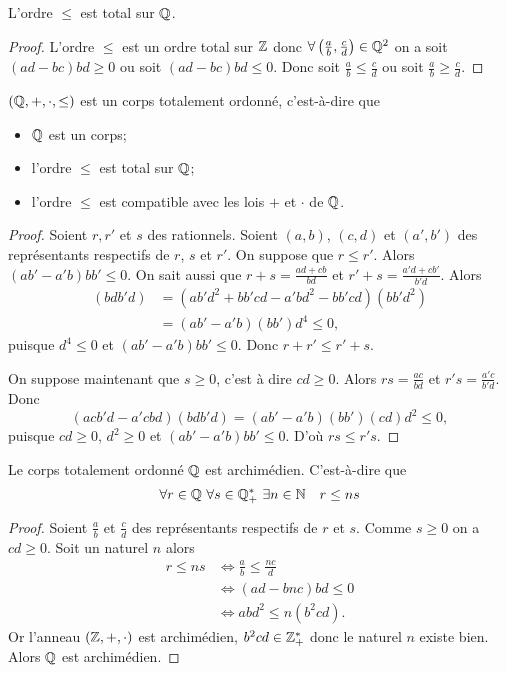 \begin{prop}
  L'ordre $\leq $ est total sur $\mathbb{Q}$.
\end{prop}
\begin{proof}
  L'ordre $\leq $ est un ordre total sur $\mathbb{Z}$ donc $\forall \left( \frac{a}{b}, \frac{c}{d} \right) \in \mathbb{Q}^2$ on a soit $(ad-bc)bd \geq 0$ ou soit $(ad-bc)bd \leq 0$. Donc soit $\frac{a}{b} \leq \frac{c}{d}$ ou soit $\frac{a}{b} \geq \frac{c}{d}$.
\end{proof}
\begin{prop}
  $(\mathbb{Q},+,\cdot, \leq)$ est un corps totalement ordonné, c'est-à-dire que
  \begin{itemize}
  \item $\mathbb{Q}$ est un corps;
  \item l'ordre $\leq$ est total sur $\mathbb{Q}$;
  \item l'ordre $\leq$ est compatible avec les lois $+$ et $\cdot$ de $\mathbb{Q}$.
  \end{itemize}
\end{prop}
\begin{proof}
  Soient $r,r'$ et $s$ des rationnels. Soient $(a,b)$, $(c,d)$ et $(a',b')$ des représentants respectifs de $r$, $s$ et $r'$. On suppose que $r \leq r'$. Alors $(ab'-a'b)bb' \leq 0$. On sait aussi que $r+s = \frac{ad+cb}{bd}$ et $r'+s=\frac{a'd+cb'}{b'd}$. Alors
  \begin{align}
    [(ad+bc)b'd-(a'd+cb')bd](bdb'd) &= (ab'd^2+bb'cd-a'bd^2-bb'cd)(bb'd^2) \\
    &=(ab'-a'b)(bb')d^4 \leq 0,
  \end{align}
  puisque $d^4 \leq 0$ et $(ab'-a'b)bb' \leq 0$. Donc $r+r' \leq r'+s$.

  On suppose maintenant que $s \geq 0$, c'est à dire $cd \geq 0$. Alors $rs = \frac{ac}{bd}$ et $r's = \frac{a'c}{b'd}$. Donc
  \begin{equation}
    (acb'd-a'cbd)(bdb'd) = (ab'-a'b)(bb')(cd)d^2 \leq 0,
  \end{equation}
  puisque $cd \geq 0$, $d^2 \geq 0$ et $(ab'-a'b)bb' \leq 0$. D'où $rs \leq r's$.
\end{proof}
\begin{prop}
  Le corps totalement ordonné $\mathbb{Q}$ est archimédien. C'est-à-dire que
  \begin{equation}
    \forall r \in \mathbb{Q} \ \forall s \in \mathbb{Q}^*_+ \ \exists n \in \mathbb{N} \quad r \leq ns
  \end{equation}
\end{prop}
\begin{proof}
  Soient $\frac{a}{b}$ et $\frac{c}{d}$ des représentants respectifs de $r$ et $s$. Comme $s \geq 0$ on a $cd \geq 0$. Soit un naturel $n$ alors
  \begin{align}
    r \leq ns &\iff \frac{a}{b} \leq \frac{nc}{d} \\
    &\iff (ad-bnc)bd \leq 0 \\
    &\iff abd^2 \leq n(b^2cd).
  \end{align}
  Or l'anneau $(\mathbb{Z},+,\cdot)$ est archimédien, $b^2cd \in \mathbb{Z}^*_+$ donc le naturel $n$ existe bien. Alors $\mathbb{Q}$ est archimédien.
\end{proof}

